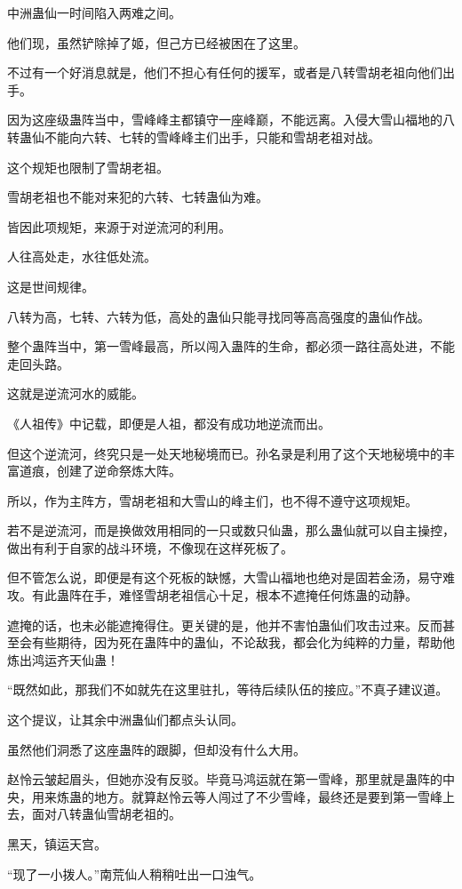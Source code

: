 \begin{this_body}
中洲蛊仙一时间陷入两难之间。

他们现，虽然铲除掉了姬，但己方已经被困在了这里。

不过有一个好消息就是，他们不担心有任何的援军，或者是八转雪胡老祖向他们出手。

因为这座级蛊阵当中，雪峰峰主都镇守一座峰巅，不能远离。入侵大雪山福地的八转蛊仙不能向六转、七转的雪峰峰主们出手，只能和雪胡老祖对战。

这个规矩也限制了雪胡老祖。

雪胡老祖也不能对来犯的六转、七转蛊仙为难。

皆因此项规矩，来源于对逆流河的利用。

人往高处走，水往低处流。

这是世间规律。

八转为高，七转、六转为低，高处的蛊仙只能寻找同等高高强度的蛊仙作战。

整个蛊阵当中，第一雪峰最高，所以闯入蛊阵的生命，都必须一路往高处进，不能走回头路。

这就是逆流河水的威能。

《人祖传》中记载，即便是人祖，都没有成功地逆流而出。

但这个逆流河，终究只是一处天地秘境而已。孙名录是利用了这个天地秘境中的丰富道痕，创建了逆命祭炼大阵。

所以，作为主阵方，雪胡老祖和大雪山的峰主们，也不得不遵守这项规矩。

若不是逆流河，而是换做效用相同的一只或数只仙蛊，那么蛊仙就可以自主操控，做出有利于自家的战斗环境，不像现在这样死板了。

但不管怎么说，即便是有这个死板的缺憾，大雪山福地也绝对是固若金汤，易守难攻。有此蛊阵在手，难怪雪胡老祖信心十足，根本不遮掩任何炼蛊的动静。

遮掩的话，也未必能遮掩得住。更关键的是，他并不害怕蛊仙们攻击过来。反而甚至会有些期待，因为死在蛊阵中的蛊仙，不论敌我，都会化为纯粹的力量，帮助他炼出鸿运齐天仙蛊！

“既然如此，那我们不如就先在这里驻扎，等待后续队伍的接应。”不真子建议道。

这个提议，让其余中洲蛊仙们都点头认同。

虽然他们洞悉了这座蛊阵的跟脚，但却没有什么大用。

赵怜云皱起眉头，但她亦没有反驳。毕竟马鸿运就在第一雪峰，那里就是蛊阵的中央，用来炼蛊的地方。就算赵怜云等人闯过了不少雪峰，最终还是要到第一雪峰上去，面对八转蛊仙雪胡老祖的。

黑天，镇运天宫。

“现了一小拨人。”南荒仙人稍稍吐出一口浊气。


\end{this_body}
